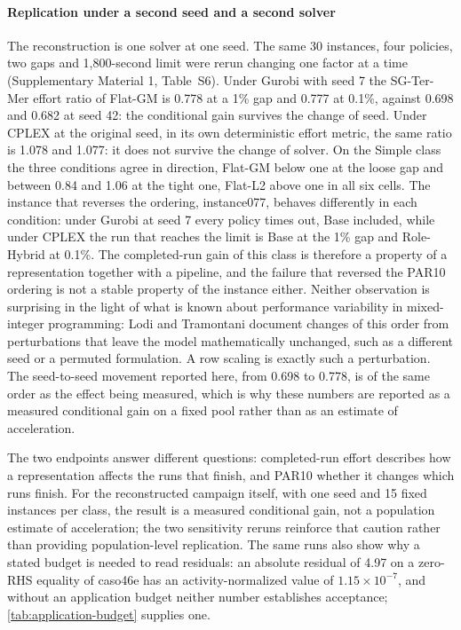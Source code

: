 \documentclass[11pt]{article}
\theoremstyle{definition}
\theoremstyle{remark}
\begin{document}
\paragraph{Replication under a second seed and a second solver} The reconstruction is one
solver at one seed. The same 30 instances, four policies, two gaps and 1,800-second limit were
rerun changing one factor at a time (Supplementary Material 1, Table~S6). Under Gurobi with seed 7 the
SG-Ter-Mer effort ratio of Flat-GM is 0.778 at a 1\% gap and 0.777 at 0.1\%, against 0.698 and
0.682 at seed 42: the conditional gain survives the change of seed. Under CPLEX at the original
seed, in its own deterministic effort metric, the same ratio is 1.078 and 1.077: it does not survive
the change of solver. On the Simple class the three conditions agree in direction, Flat-GM below
one at the loose gap and between 0.84 and 1.06 at the tight one, Flat-L2 above one in all six
cells. The instance that reverses the ordering, instance077, behaves differently in each
condition: under Gurobi at seed 7 every policy times
out, Base included, while under CPLEX the run that reaches the limit is Base at the 1\% gap and
Role-Hybrid at 0.1\%.
The completed-run gain of this class is therefore a property of a representation together with a
pipeline, and the failure that reversed the PAR10 ordering is not a stable property of the
instance either. Neither observation is surprising in the light of what is known about
performance variability in mixed-integer programming: Lodi and Tramontani
\cite{lodi2013variability} document changes of this order from perturbations that leave the
model mathematically unchanged, such as a different seed or a permuted formulation. A row
scaling is exactly such a perturbation. The seed-to-seed movement reported here, from 0.698 to
0.778, is of the same order as the effect being measured, which is why these numbers are
reported as a measured conditional gain on a fixed pool rather than as an estimate of
acceleration.

The two endpoints answer different questions: completed-run effort describes how a
representation affects the runs that finish, and PAR10 whether it changes which runs finish.
For the reconstructed campaign itself, with one seed and 15 fixed instances per class, the
result is a measured conditional gain, not a population estimate of acceleration; the two
sensitivity reruns reinforce that caution rather than providing population-level replication. The same runs also show why a stated budget is
needed to read residuals: an absolute residual of 4.97 on a zero-RHS equality of caso46e has an
activity-normalized value of $1.15\times10^{-7}$, and without an application budget neither
number establishes acceptance; \cref{tab:application-budget} supplies one.
\end{document}
